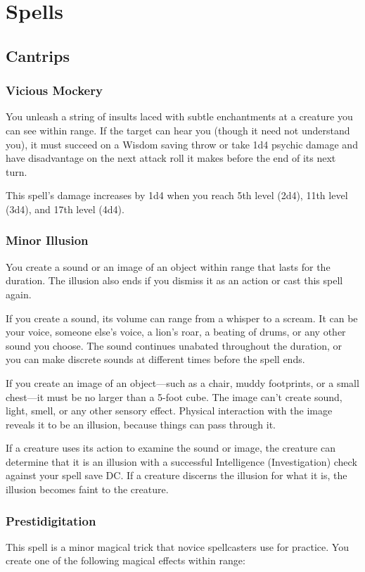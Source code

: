\documentclass[11pt]{article}
\begin{document}
\section{Spells}
\label{sec:org6de41ae}
\subsection{Cantrips}
\label{sec:org53780dd}
\subsubsection{Vicious Mockery}
\label{sec:org0c78474}
You unleash a string of insults laced with subtle enchantments at a creature you can see within range. If the target can hear you (though it need not understand you), it must succeed on a Wisdom saving throw or take 1d4 psychic damage and have disadvantage on the next attack roll it makes before the end of its next turn.

This spell's damage increases by 1d4 when you reach 5th level (2d4), 11th level (3d4), and 17th level (4d4).
\subsubsection{Minor Illusion}
\label{sec:org4009868}
You create a sound or an image of an object within range that lasts for the duration. The illusion also ends if you dismiss it as an action or cast this spell again.

If you create a sound, its volume can range from a whisper to a scream. It can be your voice, someone else's voice, a lion's roar, a beating of drums, or any other sound you choose. The sound continues unabated throughout the duration, or you can make discrete sounds at different times before the spell ends.

If you create an image of an object—such as a chair, muddy footprints, or a small chest—it must be no larger than a 5-foot cube. The image can't create sound, light, smell, or any other sensory effect. Physical interaction with the image reveals it to be an illusion, because things can pass through it.

If a creature uses its action to examine the sound or image, the creature can determine that it is an illusion with a successful Intelligence (Investigation) check against your spell save DC. If a creature discerns the illusion for what it is, the illusion becomes faint to the creature.
\subsubsection{Prestidigitation}
\label{sec:org4ea7efc}
This spell is a minor magical trick that novice spellcasters use for practice. You create one of the following magical effects within range:
\end{document}
